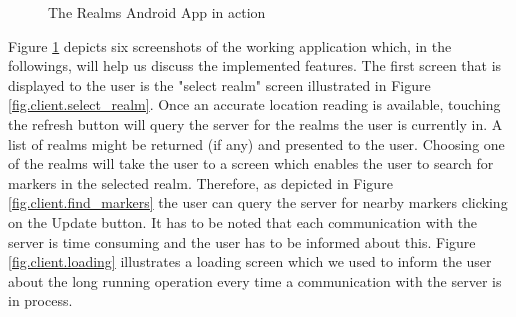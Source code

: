 \begin{figure}[H]
{                \label{fig.client.info_marker}
        }
        \caption{The Realms Android App in action}
        \label{fig.client}
\end{figure}
\noindent Figure \ref{fig.client} depicts six screenshots of the working application which, in the followings, will help us discuss the implemented features. The first screen that is displayed to the user is the "select realm" screen illustrated in Figure \ref{fig.client.select_realm}. Once an accurate location reading is available, touching the refresh button will query the server for the realms the user is currently in. A list of realms might be returned (if any) and presented to the user. Choosing one of the realms will take the user to a screen which enables the user to search for markers in the selected realm. Therefore, as depicted in Figure \ref{fig.client.find_markers} the user can query the server for nearby markers clicking on the Update button. It has to be noted that each communication with the server is time consuming and the user has to be informed about this. Figure \ref{fig.client.loading} illustrates a loading screen which we used to inform the user about the long running operation every time a communication with the server is in process.
\\

